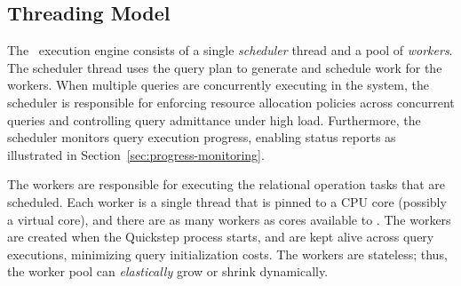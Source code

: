 %

\subsection{Threading Model} \label{sec:threading-model}
The \Quickstep\ execution engine consists of a single \textit{scheduler} thread and a pool of \textit{workers}.
The scheduler thread uses the query plan to generate and schedule work for the workers.
When multiple queries are concurrently executing in the system, the scheduler is responsible for enforcing resource allocation policies across concurrent queries and controlling query admittance under high load.
Furthermore, the scheduler monitors query execution progress, enabling status reports as illustrated in Section~\ref{sec:progress-monitoring}.

The workers are responsible for executing the relational operation tasks that are scheduled.
Each worker is a single thread that is pinned to a CPU core (possibly a virtual core), and there are as many workers as cores available to \Quickstep.
The workers are created when the Quickstep process starts, and are kept alive across query executions, minimizing query initialization costs.
The workers are stateless; thus, the worker pool can \textit{elastically} grow or shrink dynamically. %

